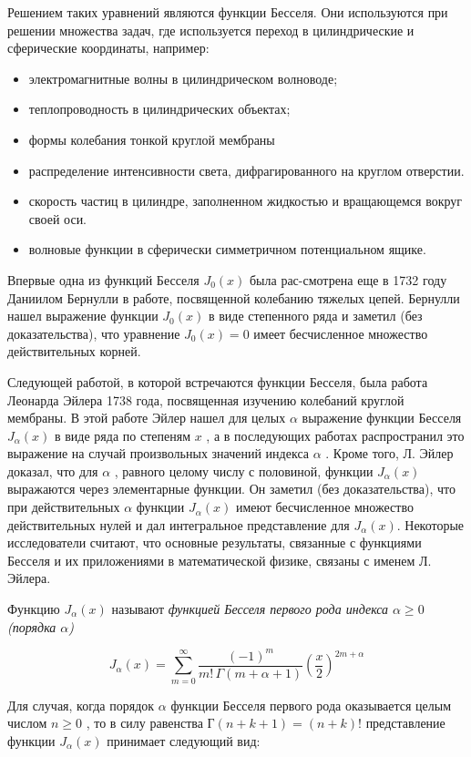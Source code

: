 \documentclass[14pt]{extarticle}
\begin{document}
Решением таких уравнений являются функции Бесселя.
Они используются при решении множества задач, где используется переход в цилиндрические и сферические координаты, например:
\begin{itemize}
	\item электромагнитные волны в цилиндрическом волноводе;
	\item теплопроводность в цилиндрических объектах;
	\item формы колебания тонкой круглой мембраны
	\item распределение интенсивности света, дифрагированного на круглом отверстии.
	\item скорость частиц в цилиндре, заполненном жидкостью и вращающемся вокруг своей оси.
	\item волновые функции в сферически симметричном потенциальном ящике.
\end{itemize}
Впервые одна из функций Бесселя $J_0(x)$ была рас-смотрена еще в 1732 году Даниилом Бернулли в работе, посвященной колебанию тяжелых цепей. Бернулли нашел выражение функции $J_0(x)$ в виде степенного ряда и заметил (без доказательства), что уравнение $J_0(x)=0$ имеет бесчисленное множество действительных корней. 

Следующей работой, в которой встречаются функции Бесселя, была работа Леонарда Эйлера 1738 года, посвященная изучению колебаний круглой мембраны. В этой работе Эйлер нашел для целых $\alpha$ выражение функции Бесселя $J_\alpha(x)$ в виде ряда по степеням $x$ , а в последующих работах распространил это выражение на случай произвольных значений индекса $\alpha$ . Кроме того, Л. Эйлер доказал, что для $\alpha$ , равного целому числу с половиной, функции $J_\alpha(x)$ выражаются через элементарные функции. Он заметил (без доказательства), что при действительных $\alpha$ функции $J_\alpha(x)$ имеют бесчисленное множество действительных нулей и дал интегральное представление для $J_\alpha(x)$. Некоторые исследователи считают, что основные результаты, связанные с функциями Бесселя и их приложениями в математической физике, связаны с именем Л. Эйлера. \cite{Urmat}  

Функцию $J_\alpha(x)$ называют \textit{функцией Бесселя первого рода индекса $\alpha \ge 0$ (порядка  $\alpha$)}

$$
	J_\alpha(x) = \sum_{m=0}^\infty \frac{(-1)^m}{m!\, \Gamma(m+\alpha+1)} {\left({\frac{x}{2}}\right)}^{2m+\alpha} 
$$

Для случая, когда порядок $\alpha$ функции Бесселя первого рода оказывается целым числом $n \ge 0$ , то в силу равенства $Г(n+k+1)=(n+k)!$ представление функции $J_\alpha(x)$ принимает следующий вид:
\end{document}
